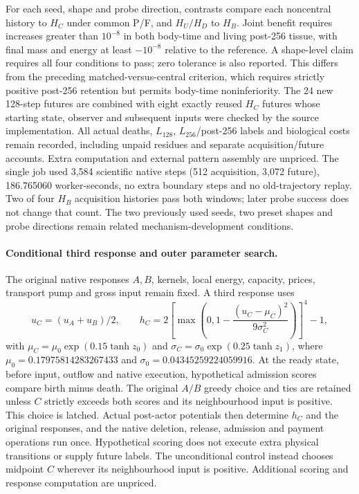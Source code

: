 For each seed, shape and probe direction, contrasts compare each noncentral history to $H_C$ under common P/F, and $H_U/H_D$ to $H_B$. Joint benefit requires increases greater than $10^{-8}$ in both body-time and living post-256 tissue, with final mass and energy at least $-10^{-8}$ relative to the reference. A shape-level claim requires all four conditions to pass; zero tolerance is also reported. This differs from the preceding matched-versus-central criterion, which requires strictly positive post-256 retention but permits body-time noninferiority. The 24 new 128-step futures are combined with eight exactly reused $H_C$ futures whose starting state, observer and subsequent inputs were checked by the source implementation. All actual deaths, $L_{128}$, $L_{256}$/post-256 labels and biological costs remain recorded, including unpaid residues and separate acquisition/future accounts. Extra computation and external pattern assembly are unpriced. The single job used 3,584 scientific native steps (512 acquisition, 3,072 future), 186.765060 worker-seconds, no extra boundary steps and no old-trajectory replay. Two of four $H_B$ acquisition histories pass both windows; later probe success does not change that count. The two previously used seeds, two preset shapes and probe directions remain related mechanism-development conditions.

\paragraph{Conditional third response and outer parameter search.}
The original native responses $A,B$, kernels, local energy, capacity, prices, transport pump and gross input remain fixed. A third response uses
\[
u_C=(u_A+u_B)/2,\qquad
h_C=2\left[\max\left(0,1-\frac{(u_C-\mu_C)^2}{9\sigma_C^2}\right)\right]^4-1,
\]
with $\mu_C=\mu_0\exp(0.15\tanh z_0)$ and $\sigma_C=\sigma_0\exp(0.25\tanh z_1)$, where $\mu_0=0.17975814283267433$ and $\sigma_0=0.04345259224059916$. At the ready state, before input, outflow and native execution, hypothetical admission scores compare birth minus death. The original $A/B$ greedy choice and ties are retained unless $C$ strictly exceeds both scores and its neighbourhood input is positive. This choice is latched. Actual post-actor potentials then determine $h_C$ and the original responses, and the native deletion, release, admission and payment operations run once. Hypothetical scoring does not execute extra physical transitions or supply future labels. The unconditional control instead chooses midpoint $C$ wherever its neighbourhood input is positive. Additional scoring and response computation are unpriced.

